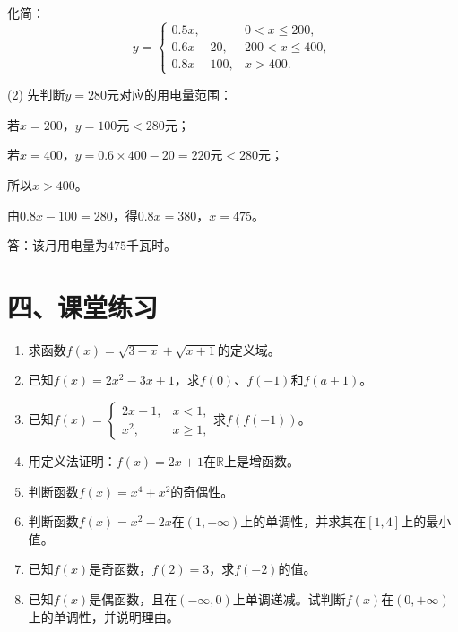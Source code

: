 \documentclass[12pt, a4paper]{ctexart}
\begin{document}
化简：
\[
y =
\begin{cases}
0.5x,            & 0<x\leq 200, \\
0.6x-20,         & 200<x\leq 400, \\
0.8x-100,        & x>400.
\end{cases}
\]

(2) 先判断$y=280$元对应的用电量范围：

若$x=200$，$y=100$元$<280$元；

若$x=400$，$y=0.6\times 400-20=220$元$<280$元；

所以$x>400$。

由$0.8x-100=280$，得$0.8x=380$，$x=475$。

答：该月用电量为$475$千瓦时。


\newpage
\section*{\textcolor{tipgreen}{四、课堂练习}}

\begin{enumerate}[leftmargin=2em, label=\textbf{\arabic*.}]
  \item 求函数$f(x)=\sqrt{3-x}+\sqrt{x+1}$的定义域。

  \item 已知$f(x)=2x^2-3x+1$，求$f(0)$、$f(-1)$和$f(a+1)$。

  \item 已知$f(x)=\begin{cases}2x+1, & x<1, \\ x^2, & x\geq 1,\end{cases}$求$f(f(-1))$。

  \item 用定义法证明：$f(x)=2x+1$在$\mathbb{R}$上是增函数。

  \item 判断函数$f(x)=x^4+x^2$的奇偶性。

  \item 判断函数$f(x)=x^2-2x$在$(1,+\infty)$上的单调性，并求其在$[1,4]$上的最小值。

  \item 已知$f(x)$是奇函数，$f(2)=3$，求$f(-2)$的值。

  \item 已知$f(x)$是偶函数，且在$(-\infty,0)$上单调递减。试判断$f(x)$在$(0,+\infty)$上的单调性，并说明理由。
\end{enumerate}
\end{document}
